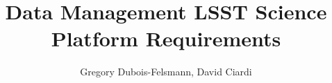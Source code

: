 \title{Data Management LSST Science Platform Requirements}
\author{Gregory Dubois-Felsmann, David Ciardi}

